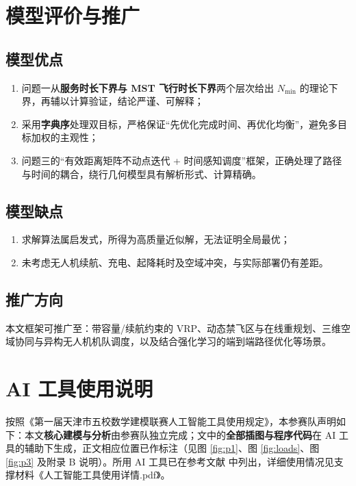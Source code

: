 \documentclass[12pt,a4paper]{ctexart}
\begin{document}
\section{模型评价与推广}

\subsection{模型优点}

\begin{enumerate}
  \item 问题一从\textbf{服务时长下界与 MST 飞行时长下界}两个层次给出 $N_{\min}$ 的理论下界，再辅以计算验证，结论严谨、可解释；
  \item 采用\textbf{字典序}处理双目标，严格保证``先优化完成时间、再优化均衡''，避免多目标加权的主观性；
  \item 问题三的``有效距离矩阵不动点迭代 + 时间感知调度''框架，正确处理了路径与时间的耦合，绕行几何模型具有解析形式、计算精确。
\end{enumerate}

\subsection{模型缺点}

\begin{enumerate}
  \item 求解算法属启发式，所得为高质量近似解，无法证明全局最优；
  \item 未考虑无人机续航、充电、起降耗时及空域冲突，与实际部署仍有差距。
\end{enumerate}

\subsection{推广方向}

本文框架可推广至：带容量/续航约束的 VRP、动态禁飞区与在线重规划、三维空域协同与异构无人机机队调度，以及结合强化学习的端到端路径优化等场景。

\section{AI 工具使用说明}

按照《第一届天津市五校数学建模联赛人工智能工具使用规定》，本参赛队声明如下：本文\textbf{核心建模与分析}由参赛队独立完成；文中的\textbf{全部插图与程序代码}在 AI 工具的辅助下生成，正文相应位置已作标注（见图 \ref{fig:p1}、图 \ref{fig:loads}、图 \ref{fig:p3} 及附录 B 说明）。所用 AI 工具已在参考文献 \cite{ai:claude} 中列出，详细使用情况见支撑材料《人工智能工具使用详情.pdf》。
\end{document}
